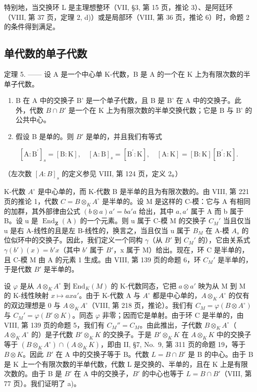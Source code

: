 特别地，当交换环 L 是主理想整环（VII, §3, 第 15 页，推论 3）、是阿廷环（VIII, 第 37 页，定理 2, d)）或是局部环（VIII, 第 36 页，推论 6）时，命题 2 的条件得到满足。

\subsection{单代数的单子代数}

定理 5. —— 设 A 是一个中心单 K-代数，B 是 A 的一个在 K 上为有限次数的半单子代数。

\begin{enumerate}
\def\labelenumi{\alph{enumi})}
\item
  B 在 A 中的交换子 B' 是一个单子代数，且 B 是 B' 在 A 中的交换子。此外，代数 \(B \cap B'\) 是一个在 K 上为有限次数的半单交换代数；它是 B 与 B' 的公共中心。
\item
  假设 B 是单的。则 \(B'\) 是单的，并且我们有等式
\end{enumerate}

\[
[ \mathrm{A}: \mathrm{B} ^ {\prime} ] _ {s} = [ \mathrm{B}: \mathrm{K} ], \quad [ \mathrm{A}: \mathrm{B} ] _ {s} = [ \mathrm{B} ^ {\prime}: \mathrm{K} ], \quad [ \mathrm{A}: \mathrm{K} ] = [ \mathrm{B}: \mathrm{K} ] [ \mathrm{B} ^ {\prime}: \mathrm{K} ].
\]

（左次数 \([A : B]_s\) 的定义参见 VIII, 第 124 页，定义 2。）

K-代数 \(A^{\circ}\) 是中心单的，而 K-代数 B 是半单的且为有限次数的。由 VIII, 第 221 页的推论 1，代数 \(C = B \otimes_{K} A^{\circ}\) 是半单的。设 M 是这样的 C-模：它与 A 有相同的加群，其外部律由公式 \((b \otimes a)a' = ba'a\) 给出，其中 \(a, a'\) 属于 A 而 b 属于 B。设 u 是 \(\operatorname{End}_{\mathbf{Z}}(\mathrm{A})\) 的一个元素。则 u 属于 C-模 M 的交换子 \(C_{M}'\) 当且仅当 u 是右 A-线性的且是左 B-线性的，换言之，当且仅当 u 属于 \(B_{M}\) 在 A-模 \(A_{s}\) 的位似环中的交换子。因此，我们定义一个同构 \(\gamma\)（从 \(B'\) 到 \(C_{M}'\) 的），它由关系式 \(\gamma(b')(x) = b'x\)（其中 \(b'\) 属于 \(B'\)，x 属于 M）给出。现在，环 C 是半单的，且 C-模 M 由 A 的元素 1 生成。由 VIII, 第 139 页的命题 6，环 \(C_{M}'\) 是半单的，于是代数 \(B'\) 是半单的。

设 \(\varphi\) 是从 \(A \otimes_K A^\circ\) 到 \(\mathrm{End}_K(M)\) 的 K-代数同态，它把 \(a \otimes a'\) 映为从 M 到 M 的 K-线性映射 \(x \mapsto axa'\)。由于 K-代数 A 与 \(A^\circ\) 都是中心单的，\(A \otimes_K A^\circ\) 的仅有的双边理想是 0 与 \(A \otimes_K A^\circ\)（VIII, 第 218 页，推论）。我们有 \(C_M = \varphi(B \otimes A^\circ)\) 与 \(C_M' = \varphi(B' \otimes K)\)。同态 \(\varphi\) 非零；因而它是单射。由于环 C 是半单的，由 VIII, 第 139 页的命题 5，我们有 \(C_M'' = C_M\)。由此推出，子代数 \(B \otimes_K A^\circ\)（\(A \otimes_K A^\circ\) 的）是子代数 \(B' \otimes_K K\) 的交换子。于是 \(B' \otimes_K K\) 在 \(A \otimes_K K\) 中的交换子等于 \((B \otimes_K A^\circ) \cap (A \otimes_K K)\)，即由 II, §7, No.~9, 第 311 页的命题 19，等于 \(B \otimes K\)。因此 \(B'\) 在 A 中的交换子等于 B。代数 \(L = B \cap B'\) 是 B 的中心。由于 B 是 K 上一个有限次数的半单代数，代数 L 是交换的、半单的，且在 K 上是有限次数的。由于 B 是 \(B'\) 在 A 中的交换子，\(B'\) 的中心也等于 \(L = B \cap B'\)（VIII, 第 77 页）。我们证明了 a)。

